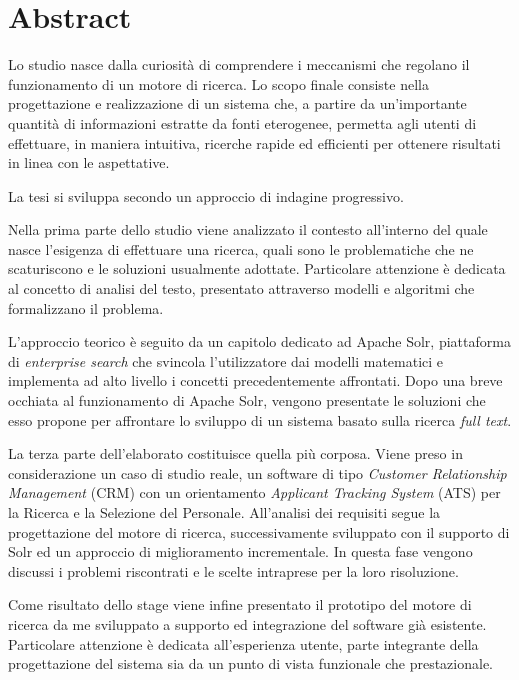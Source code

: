 \null{}


\chapter*{\centering Abstract}

Lo studio nasce dalla curiosità di comprendere i meccanismi che regolano il funzionamento di un motore di ricerca. Lo scopo finale consiste nella progettazione e realizzazione di un sistema che, a partire da un'importante quantità di informazioni estratte da fonti eterogenee, permetta agli utenti di effettuare, in maniera intuitiva, ricerche rapide ed efficienti per ottenere risultati in linea con le aspettative.

\vspace{1\baselineskip}

La tesi si sviluppa secondo un approccio di indagine progressivo. 

Nella prima parte dello studio viene analizzato il contesto all’interno del quale nasce l’esigenza di effettuare una ricerca, quali sono le problematiche che ne scaturiscono e le soluzioni usualmente adottate. Particolare attenzione è dedicata al concetto di analisi del testo, presentato attraverso modelli e algoritmi che formalizzano il problema.

L’approccio teorico è seguito da un capitolo dedicato ad Apache Solr, piattaforma di \textit{enterprise search} che svincola l’utilizzatore dai modelli matematici e implementa ad alto livello i concetti precedentemente affrontati. Dopo una breve occhiata al funzionamento di Apache Solr, vengono presentate le soluzioni che esso propone per affrontare lo sviluppo di un sistema basato sulla ricerca \textit{full text}.

La terza parte dell’elaborato costituisce quella più corposa. Viene preso in considerazione un caso di studio reale, un software di tipo \textit{Customer Relationship Management} (CRM) con un orientamento \textit{Applicant Tracking System} (ATS) per la Ricerca e la Selezione del Personale. All’analisi dei requisiti segue la progettazione del motore di ricerca, successivamente sviluppato con il supporto di Solr ed un approccio di miglioramento incrementale. In questa fase vengono discussi i problemi riscontrati e le scelte intraprese per la loro risoluzione.

Come risultato dello stage viene infine presentato il prototipo del motore di ricerca da me sviluppato a supporto ed integrazione del software già esistente. Particolare attenzione è dedicata all’esperienza utente, parte integrante della progettazione del sistema sia da un punto di vista funzionale che prestazionale.


 \null
